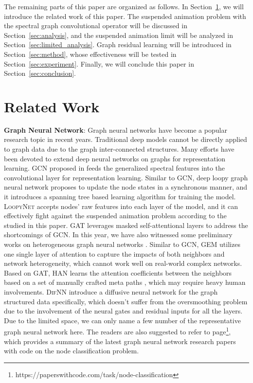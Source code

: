 \documentclass{article}
\newcommand{\gcn}{\textsc{GCN}}
\newcommand{\dif}{\textsc{DifNN}}
\newcommand{\loopy}{\textsc{LoopyNet}}
\begin{document}
The remaining parts of this paper are organized as follows. In Section~\ref{sec:related_work}, we will introduce the related work of this paper. The suspended animation problem with the spectral graph convolutional operator will be discussed in Section~\ref{sec:analysis}, and the suspended animation limit will be analyzed in Section~\ref{sec:limited_analysis}. Graph residual learning will be introduced in Section~\ref{sec:method}, whose effectiveness will be tested in Section~\ref{sec:experiment}. Finally, we will conclude this paper in Section~\ref{sec:conclusion}.

\vspace{-8pt}
\section{Related Work}\label{sec:related_work}
\vspace{-8pt}

\noindent \textbf{Graph Neural Network}: Graph neural networks \cite{MBMRSB17, AT16, MBBV15, KW16, BHBSZMTRSF18, BDSW18, SGTHM09, ZCZYLS18, NAK16} have become a popular research topic in recent years. Traditional deep models cannot be directly applied to graph data due to the graph inter-connected structures. Many efforts have been devoted to extend deep neural networks on graphs for representation learning. GCN proposed in \cite{KW16} feeds the generalized spectral features into the convolutional layer for representation learning. Similar to {\gcn}, deep loopy graph neural network \cite{loopynet} proposes to update the node states in a synchronous manner, and it introduces a spanning tree based learning algorithm for training the model. {\loopy} accepts nodes' raw features into each layer of the model, and it can effectively fight against the suspended animation problem according to the studied in this paper. GAT \cite{PGAAPY18}  leverages masked self-attentional layers to address the shortcomings of GCN. In this year, we have also witnessed some preliminary works on heterogeneous graph neural networks \cite{WJSWYCY19, LCYZLS18}. Similar to GCN, GEM \cite{LCYZLS18} utilizes one single layer of attention to capture the impacts of both neighbors and network heterogeneity, which cannot work well on real-world complex networks. Based on GAT, HAN \cite{WJSWYCY19} learns the attention coefficients between the neighbors based on a set of manually crafted meta paths \cite{SBGAH11}, which may require heavy human involvements. {\dif} \cite{difnet} introduce a diffusive neural network for the graph structured data specifically, which doesn't suffer from the oversmoothing problem due to the involvement of the neural gates and residual inputs for all the layers. Due to the limited space, we can only name a few number of the representative graph neural network here. The readers are also suggested to refer to page\footnote{https://paperswithcode.com/task/node-classification}, which provides a summary of the latest graph neural network research papers with code on the node classification problem. 
\end{document}
